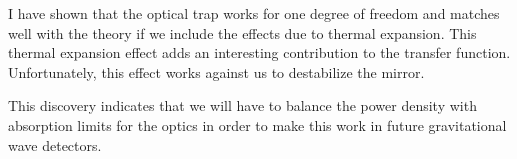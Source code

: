 I have shown that the optical trap works for one degree of freedom and
matches well with the theory if we include the effects due to thermal
expansion.
This thermal expansion effect adds an interesting contribution to the transfer
function. Unfortunately, this effect works against us to destabilize the mirror.

This discovery indicates that we will have to balance the power density with
absorption limits for the optics in order to make this work in future
gravitational wave detectors.


